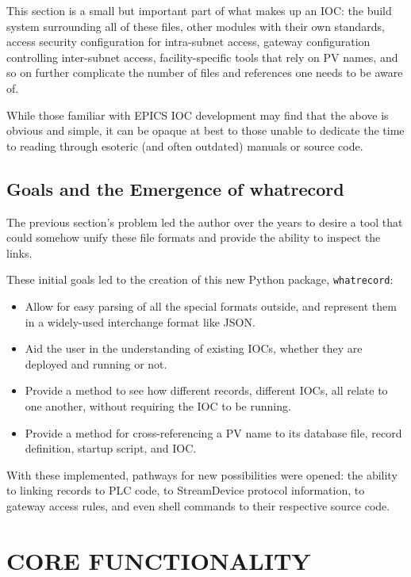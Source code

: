\documentclass[letter,
               keeplastbox,   %
               ]{jacow}
\begin{document}
This section is a small but important part of what makes up an IOC: the build
system surrounding all of these files, other modules with their own standards,
access security configuration for intra-subnet access, gateway configuration
controlling inter-subnet access, facility-specific tools that rely on PV
names, and so on further complicate the number of files and references
one needs to be aware of.

While those familiar with EPICS IOC development may find that the above is
obvious and simple, it can be opaque at best to those unable to dedicate the
time to reading through esoteric (and often outdated) manuals or source
code.

\subsection{Goals and the Emergence of whatrecord}

The previous section's problem led the author over the years to desire a tool
that could somehow unify these file formats and provide the ability to inspect
the links.

These initial goals led to the creation of this new Python package,
\verb_whatrecord_:
\begin{itemize}
  \item Allow for easy parsing of all the special formats outside, and
    represent them in a widely-used interchange format like JSON.
  \item Aid the user in the understanding of existing IOCs, whether they are
    deployed and running or not.
  \item Provide a method to see how different records, different IOCs, all
    relate to one another, without requiring the IOC to be running.
  \item Provide a method for cross-referencing a PV name to its database
    file, record definition, startup script, and IOC.
\end{itemize}

With these implemented, pathways for new possibilities were opened: the ability
to linking records to PLC code, to StreamDevice protocol information, to
gateway access rules, and even shell commands to their respective source code.

\section{CORE FUNCTIONALITY}
\end{document}
